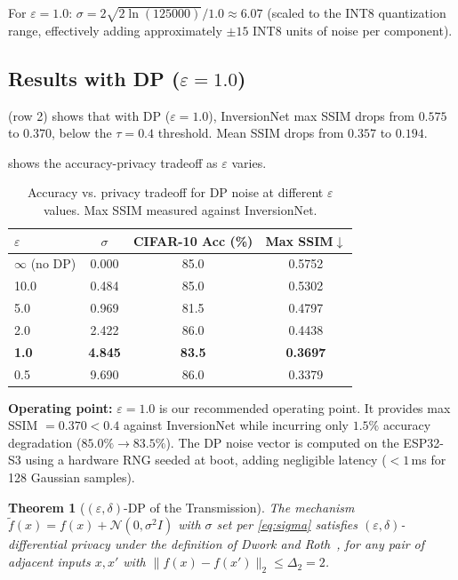 \documentclass[journal]{IEEEtran}
\newtheorem{theorem}{Theorem}
\newcommand{\eps}{\varepsilon}
\begin{document}
For $\eps = 1.0$: $\sigma = 2\sqrt{2\ln(125000)} / 1.0 \approx 6.07$
(scaled to the INT8 quantization range, effectively adding
approximately $\pm 15$ INT8 units of noise per component).

\subsection{Results with DP ($\eps = 1.0$)}

 (row 2) shows that with DP ($\eps=1.0$),
InversionNet max SSIM drops from $0.575$ to $0.370$,
below the $\tau = 0.4$ threshold.
Mean SSIM drops from $0.357$ to $0.194$.

 shows the accuracy-privacy tradeoff as
$\eps$ varies.

\begin{table}[tb]
  \centering
  \caption{Accuracy vs. privacy tradeoff for DP noise at different $\eps$ values.
           Max SSIM measured against InversionNet.}
  \label{tab:dpaccuracy}
  \begin{tabular}{@{}lccc@{}}
    \toprule
    $\eps$ & $\sigma$ & CIFAR-10 Acc (\%) & Max SSIM$\downarrow$ \\
    \midrule
    $\infty$ (no DP) & 0.000 & 85.0 & 0.5752 \\
    10.0             & 0.484 & 85.0 & 0.5302 \\
    5.0              & 0.969 & 81.5 & 0.4797 \\
    2.0              & 2.422 & 86.0 & 0.4438 \\
    \textbf{1.0}     & \textbf{4.845} & \textbf{83.5} & \textbf{0.3697} \\
    0.5              & 9.690 & 86.0 & 0.3379 \\
    \bottomrule
  \end{tabular}
\end{table}

\textbf{Operating point:} $\eps = 1.0$ is our recommended operating
point.
It provides max SSIM $= 0.370 < 0.4$ against InversionNet while
incurring only $1.5\%$ accuracy degradation ($85.0\% \to 83.5\%$).
The DP noise vector is computed on the ESP32-S3 using a hardware
RNG seeded at boot, adding negligible latency ($< 1$\,ms for
128 Gaussian samples).

\begin{theorem}[$(\eps,\delta)$-DP of the Transmission]
\label{thm:dp}
The mechanism $\tilde{f}(x) = f(x) + \mathcal{N}(0, \sigma^2 I)$
with $\sigma$ set per \cref{eq:sigma} satisfies
$(\eps, \delta)$-differential privacy under the definition of
Dwork and Roth~\cite{Dwork2014}, for any pair of adjacent inputs
$x, x'$ with $\|f(x) - f(x')\|_2 \leq \Delta_2 = 2$.
\end{theorem}
\end{document}
